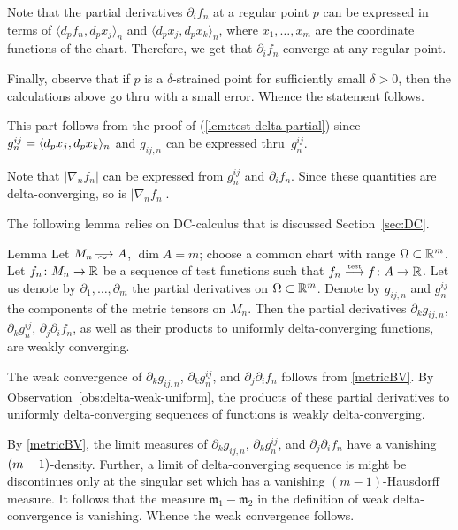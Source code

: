 Note that the partial derivatives $\partial_if_n$ at a regular point $p$ can be expressed in terms of $\langle d_pf_n,d_px_j\rangle_n$ and $\langle d_px_j,d_px_k\rangle_n$, where $x_1,\dots,x_m$ are the coordinate functions of the chart.
Therefore, we get that $\partial_if_n$ converge at any regular point.

Finally, observe that if $p$ is a $\delta$-strained point for sufficiently small $\delta>0$,
then the calculations above go thru with a small error.
Whence the statement follows.

 This part follows from the proof of (\ref{lem:test-delta-partial}) since $g^{ij}_n\zz=\langle d_px_j,d_px_k\rangle_n$ and $g_{ij,n}$ can be expressed thru~$g^{ij}_n$.

Note that $|\nabla_n f_n|$ can be expressed from $g^{ij}_n$ and $\partial_if_n$.
Since these quantities are delta-converging, so is $|\nabla_n f_n|$.
\qeds

The following lemma relies on DC-calculus that is discussed Section~\ref{sec:DC}.

\begin{thm}{Lemma}\label{lem:test-delta-partial-g}
Let $M_n\smooths{} A$, $\dim A=m$;
choose a common chart with range $\Omega\subset \mathbb{R}^m$.
Let $f_n\colon M_n\to\mathbb{R}$ be a sequence of test functions such that $f_n\zz\testto f\:A\to \RR$.
Let us denote by $\partial_1,\dots,\partial_m$ the partial derivatives on $\Omega\subset \mathbb{R}^m$.
Denote by $g_{ij,n}$ and $g^{ij}_n$ the components of the metric tensors on $M_n$.
Then  the partial derivatives $\partial_kg_{ij,n}$, $\partial_k g^{ij}_n$,  $\partial_j\partial_if_n$, as well as their products to uniformly delta-converging functions,  are weakly converging.


\end{thm}

The weak convergence of $\partial_kg_{ij,n}$, $\partial_k g^{ij}_n$, and $\partial_j\partial_if_n$
follows from \ref{metricBV}.
By Observation~\ref{obs:delta-weak-uniform}, the products of these partial derivatives to uniformly delta-converging sequences of functions is weakly delta-converging.

By \ref{metricBV}, the limit measures of $\partial_kg_{ij,n}$, $\partial_k g^{ij}_n$, and $\partial_j\partial_if_n$ have a vanishing $(m\zz-1)$-density.
Further, a limit of delta-converging sequence is might be discontinues only at the singular set which has a vanishing $(m-1)$-Hausdorff measure.
It follows that the measure $\mathfrak{m}_1-\mathfrak{m}_2$ in the definition of weak delta-convergence is vanishing. 
Whence the weak convergence follows.
\qeds

